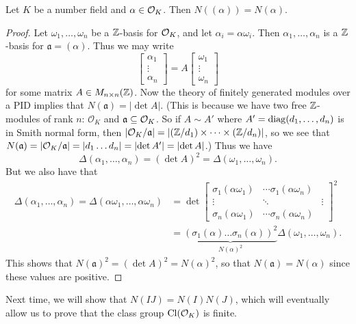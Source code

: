 \begin{theorem}
  Let $K$ be a number field and $\alpha \in \mathcal{O}_K$.
  Then $N((\alpha)) = N(\alpha)$.
\end{theorem}

\begin{proof}
  Let $\omega_1, \dots, \omega_n$ be a $\mathbb{Z}$-basis for
  $\mathcal{O}_K$, and let
  $\alpha_i = \alpha \omega_i$. Then
  $\alpha_1, \dots, \alpha_n$ is a $\mathbb{Z}$-basis for
  $\mathfrak{a} = (\alpha)$. Thus we may write
  \[
    \begin{bmatrix}
      \alpha_1 \\ \vdots \\ \alpha_n
    \end{bmatrix}
    = A
    \begin{bmatrix}
      \omega_1 \\ \vdots \\ \omega_n
    \end{bmatrix}
  \]
  for some matrix $A \in M_{n \times n}(\mathbb{Z})$.
  Now the theory of finitely generated modules over
  a PID implies that $N(\mathfrak{a}) = |{\det A}|$. (This
  is because we have two free $\mathbb{Z}$-modules of
  rank $n$: $\mathcal{O}_K$ and $\mathfrak{a} \subseteq \mathcal{O}_K$. So if $A \sim A'$ where $A' = \operatorname{diag}(d_1, \dots, d_n)$ is in Smith normal form, then
  $|\mathcal{O}_K / \mathfrak{a}| = |(\mathbb{Z} / d_1) \times \dots \times (\mathbb{Z} / d_n)|$, so we see that
  $N(\mathfrak{a}) = |\mathcal{O}_K / \mathfrak{a}| = |d_1 \dots d_n| = |{\det A'}| = |{\det A}|$.)
  Thus we have
  \[
    \Delta(\alpha_1, \dots, \alpha_n)
    = (\det A)^2 = \Delta(\omega_1, \dots, \omega_n).
  \]
  But we also have that
  \begin{align*}
    \Delta(\alpha_1, \dots, \alpha_n)
    = \Delta(\alpha \omega_1, \dots, \alpha \omega_n)
    &= \det
    \begin{bmatrix}
      \sigma_1(\alpha \omega_1) & \cdots \sigma_1(\alpha \omega_n) \\
      \vdots & \ddots & \vdots \\
      \sigma_n(\alpha \omega_1) & \cdots \sigma_n(\alpha \omega_n)
    \end{bmatrix}^2 \\
    &= \underbrace{(\sigma_1(\alpha) \dots \sigma_n(\alpha))^2}_{N(\alpha)^2} \Delta(\omega_1, \dots, \omega_n).
  \end{align*}
  This shows that $N(\mathfrak{a})^2 = (\det A)^2 = N(\alpha)^2$,
  so that $N(\mathfrak{a}) = N(\alpha)$
  since these values are positive.
\end{proof}

\begin{remark}
  Next time, we will show that
  $N(IJ) = N(I) N(J)$, which will eventually
  allow us to prove that the class group
  $\operatorname{Cl}(\mathcal{O}_K)$ is finite.
\end{remark}
